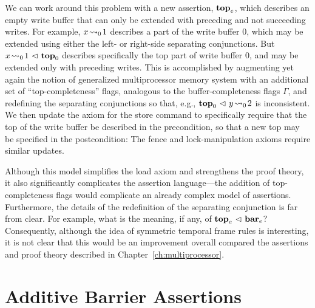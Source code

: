 \documentclass[11pt]{report}
\begin{document}
We can work around this problem with a new assertion, $\mathbf{top}_{e}$, which describes an empty write buffer that can only be extended with preceding and not succeeding writes. For example, $x \!\leadsto_{0}\! 1$ describes a part of the write buffer 0, which may be extended using either the left- or right-side separating conjunctions. But $x \!\leadsto_{0}\! 1 \operatorname{\,\vartriangleleft\,} \mathbf{top}_{0}$ describes specifically the top part of write buffer 0, and may be extended only with preceding writes. This is accomplished by augmenting yet again the notion of generalized multiprocessor memory system with an additional set of ``top-completeness'' flags, analogous to the buffer-completeness flags $\Gamma$, and redefining the separating conjunctions so that, e.g., $\mathbf{top}_{0} \operatorname{\,\vartriangleleft\,} y \!\leadsto_{0}\! 2$ is inconsistent. We then update the axiom for the store command to specifically require that the top of the write buffer be described in the precondition, so that a new top may be specified in the postcondition:  The fence and lock-manipulation axioms require similar updates. 

Although this model simplifies the load axiom and strengthens the proof theory, it also significantly complicates the assertion language---the addition of top-completeness flags would complicate an already complex model of assertions. Furthermore, the details of the redefinition of the separating conjunction is far from clear. For example, what is the meaning, if any, of $\mathbf{top}_{e} \operatorname{\,\vartriangleleft\,} \mathbf{bar}_{e}$? Consequently, although the idea of symmetric temporal frame rules is interesting, it is not clear that this would be an improvement overall compared the assertions and proof theory described in Chapter~\ref{ch:multiprocessor}. 

\section{Additive Barrier Assertions} 
\label{sec:additive-barriers}
\end{document}
